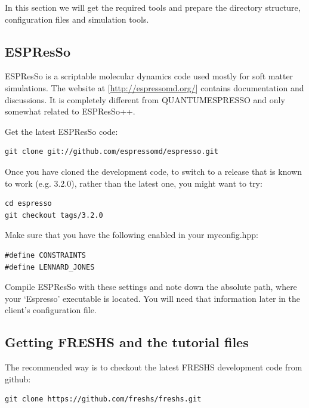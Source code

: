 \documentclass[a4paper,oneside]{article}
\newenvironment{mylisting}
{\begin{list}{}{\setlength{\leftmargin}{1em}}\item\scriptsize\bfseries}
{\end{list}}
\begin{document}
In this section we will get the required tools and prepare the directory structure, configuration files and simulation tools.

\subsection{ESPResSo}

ESPResSo is a scriptable molecular dynamics code used mostly for soft matter simulations.  The website at [\url{http://espressomd.org/}] contains documentation and discussions.  It is completely different from QUANTUMESPRESSO and only somewhat related to ESPResSo++.

Get the latest ESPResSo code:

\begin{mylisting}
\begin{verbatim}
git clone git://github.com/espressomd/espresso.git
\end{verbatim}
\end{mylisting}

Once you have cloned the development code, to switch to a release that is known to work (e.g. 3.2.0), rather than the latest one, you might want to try:

\begin{mylisting}
\begin{verbatim}
cd espresso
git checkout tags/3.2.0
\end{verbatim}
\end{mylisting}


Make sure that you have the following enabled in your myconfig.hpp:
\begin{lstlisting}
#define CONSTRAINTS
#define LENNARD_JONES
\end{lstlisting}

Compile ESPResSo with these settings and note down the absolute path, where your `Espresso' executable is located. You will need that information later in the client's configuration file.


\subsection{Getting FRESHS and the tutorial files}

The recommended way is to checkout the latest FRESHS development code from github:
\begin{mylisting}
\begin{verbatim}
git clone https://github.com/freshs/freshs.git
\end{verbatim}
\end{mylisting}
\end{document}

